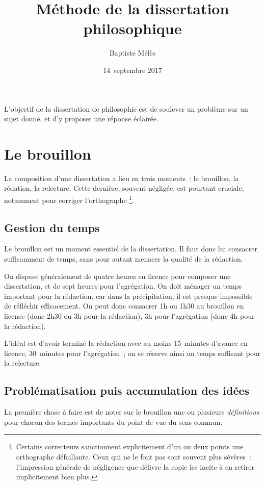 \documentclass[a4paper]{article}
\author{Baptiste Mélès}
\date{14 septembre 2017}
\title{Méthode de la dissertation philosophique}
\begin{document}
\maketitle
\setcounter{tocdepth}{3}
\tableofcontents

L'objectif de la dissertation de philosophie est de soulever un problème
sur un sujet donné, et d'y proposer une réponse éclairée.


\section{Le brouillon}
\label{sec-1}

La composition d'une dissertation a lieu en trois moments : le
brouillon, la rédation, la relecture. Cette dernière, souvent négligée,
est pourtant cruciale, notamment pour corriger l'orthographe \footnote{Certains correcteurs sanctionnent explicitement d'un ou deux points
une orthographe défaillante. Ceux qui ne le font pas sont souvent
plus sévères : l'impression générale de négligence que délivre la
copie les incite à en retirer implicitement bien plus.}.

\subsection{Gestion du temps}
\label{sec-1-1}

Le brouillon est un moment essentiel de la dissertation. Il faut donc
lui consacrer suffisamment de temps, sans pour autant menacer la qualité
de la rédaction.

On dispose généralement de quatre heures en licence pour composer une
dissertation, et de sept heures pour l'agrégation. On doit ménager un
temps important pour la rédaction, car dans la précipitation, il est
presque impossible de réfléchir efficacement. On peut donc consacrer 1h
ou 1h30 au brouillon en licence (donc 2h30 ou 3h pour la rédaction), 3h
pour l'agrégation (donc 4h pour la rédaction).

L'idéal est d'avoir terminé la rédaction avec au moins 15 minutes
d'avance en licence, 30 minutes pour l'agrégation ; on se réserve ainsi
un temps suffisant pour la relecture.

\subsection{Problématisation puis accumulation des idées}
\label{sec-1-2}

La première chose à faire est de noter sur le brouillon une ou plusieurs
\emph{définitions} pour chacun des termes importants du point de vue du sens
commun.
\end{document}
